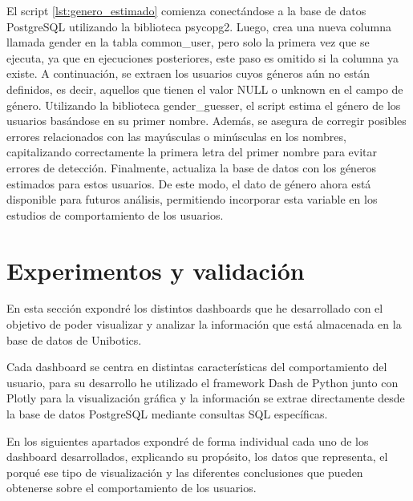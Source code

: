 \documentclass[a4paper, 12pt]{book}
\begin{document}
El script \ref{lst:genero_estimado} comienza conectándose a la base de datos PostgreSQL utilizando la biblioteca psycopg2. Luego, crea una nueva columna llamada gender en la tabla common\_user, pero solo la primera vez que se ejecuta, ya que en ejecuciones posteriores, este paso es omitido si la columna ya existe. A continuación, se extraen los usuarios cuyos géneros aún no están definidos, es decir, aquellos que tienen el valor NULL o unknown en el campo de género. Utilizando la biblioteca gender\_guesser, el script estima el género de los usuarios basándose en su primer nombre. Además, se asegura de corregir posibles errores relacionados con las mayúsculas o minúsculas en los nombres, capitalizando correctamente la primera letra del primer nombre para evitar errores de detección. Finalmente, actualiza la base de datos con los géneros estimados para estos usuarios. De este modo, el dato de género ahora está disponible para futuros análisis, permitiendo incorporar esta variable en los estudios de comportamiento de los usuarios.



\cleardoublepage



\chapter{Experimentos y validación}
\label{chap:experimentos}

En esta sección expondré los distintos dashboards que he desarrollado con el objetivo de poder visualizar y analizar la información que está almacenada en la base de datos de Unibotics.

Cada dashboard se centra en distintas características del comportamiento del usuario, para su desarrollo he utilizado el framework Dash de Python junto con Plotly para la visualización gráfica y la información se extrae directamente desde la base de datos PostgreSQL mediante consultas SQL específicas.

En los siguientes apartados expondré de forma individual cada uno de los dashboard desarrollados, explicando su propósito, los datos que representa, el porqué ese tipo de visualización y las diferentes conclusiones que pueden obtenerse sobre el comportamiento de los usuarios.
\end{document}
